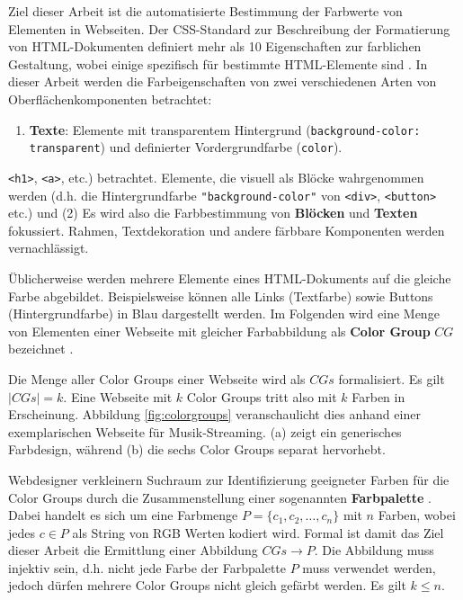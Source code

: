\documentclass[11pt,a4paper,bibliography=totoc,twocolumn]{scrartcl}
\begin{document}
Ziel dieser Arbeit ist die automatisierte Bestimmung der Farbwerte von Elementen in Webseiten. Der CSS-Standard zur Beschreibung der Formatierung von HTML-Dokumenten definiert mehr als 10 Eigenschaften zur farblichen Gestaltung, wobei einige spezifisch für bestimmte  HTML-Elemente sind  \citep{css3-color}. In dieser Arbeit werden die Farbeigenschaften von zwei verschiedenen Arten von Oberflächenkomponenten betrachtet:
\begin{enumerate}
	\item \textbf{Texte}: Elemente mit transparentem Hintergrund (\texttt{background-color: transparent}) und definierter Vordergrundfarbe (\texttt{color}). 
\end{enumerate}
\texttt{<h1>}, \texttt{<a>}, etc.) betrachtet. Elemente, die visuell als Blöcke wahrgenommen werden (d.h. die Hintergrundfarbe \texttt{"background-color"} von \texttt{<div>}, \texttt{<button>} etc.) und (2)  Es wird also die Farbbestimmung von \textbf{Blöcken} und \textbf{Texten} fokussiert. Rahmen, Textdekoration und andere färbbare Komponenten werden vernachlässigt.

Üblicherweise werden mehrere Elemente eines HTML-Dokuments auf die gleiche Farbe abgebildet. Beispielsweise können alle Links (Textfarbe) sowie Buttons (Hintergrundfarbe) in Blau dargestellt werden. Im Folgenden wird eine Menge von Elementen einer Webseite mit gleicher Farbabbildung als \textbf{Color Group} $CG$ bezeichnet \citep[siehe auch][]{webpage, patterns}. 

 Die Menge aller Color Groups einer Webseite wird als $CGs$ formalisiert. Es gilt $|CGs| = k$. Eine Webseite mit $k$ Color Groups tritt also mit $k$ Farben in Erscheinung. Abbildung \ref{fig:colorgroups} veranschaulicht dies anhand einer exemplarischen Webseite für Musik-Streaming. (a) zeigt ein generisches Farbdesign, während (b) die sechs Color Groups separat hervorhebt.

Webdesigner verkleinern Suchraum zur Identifizierung geeigneter Farben für die Color Groups durch die Zusammenstellung einer sogenannten \textbf{Farbpalette} \citep{webpage, webdesign, webx0}. Dabei handelt es sich um eine Farbmenge $P = \{c_1, c_2, \ldots, c_n\}$ mit $n$ Farben, wobei jedes $c \in P$ als String von RGB Werten kodiert wird. Formal ist damit das Ziel dieser Arbeit die Ermittlung einer Abbildung $CGs \to P$. Die Abbildung muss injektiv sein, d.h. nicht jede Farbe der Farbpalette $P$ muss verwendet werden, jedoch dürfen mehrere Color Groups nicht gleich gefärbt werden. Es gilt $k \leq n$.
\end{document}
